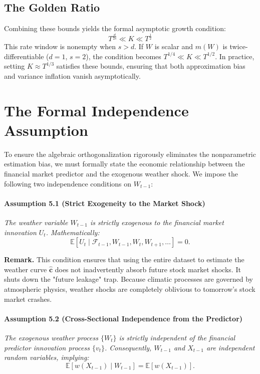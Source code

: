 \documentclass{article}
\begin{document}
\subsection{The Golden Ratio}
Combining these bounds yields the formal asymptotic growth condition:
\begin{equation}
    T^{\frac{d}{2s}} \ll K \ll T^{\frac{1}{2}}
\end{equation}
This rate window is nonempty when $s>d$.
If $W$ is scalar and $m(W)$ is twice-differentiable ($d=1$, $s=2$), the condition becomes $T^{1/4} \ll K \ll T^{1/2}$. In practice, setting $K \approx T^{1/3}$ satisfies these bounds, ensuring that both approximation bias and variance inflation vanish asymptotically.

\section{The Formal Independence Assumption}

To ensure the algebraic orthogonalization rigorously eliminates the nonparametric estimation bias, we must formally state the economic relationship between the financial market predictor and the exogenous weather shock. We impose the following two independence conditions on $W_{t-1}$:

\paragraph*{Assumption 5.1 (Strict Exogeneity to the Market Shock)} \textit{The weather variable $W_{t-1}$ is strictly exogenous to the financial market innovation $U_t$. Mathematically:}
\begin{equation}
    \mathbb{E}[U_t \mid \mathcal{F}_{t-1}, W_{t-1}, W_t, W_{t+1}, \dots ] = 0.
\end{equation}

\noindent \textbf{Remark.} This condition ensures that using the entire dataset to estimate the weather curve $\widehat{\bm{c}}$ does not inadvertently absorb future stock market shocks. It shuts down the "future leakage" trap. Because climatic processes are governed by atmospheric physics, weather shocks are completely oblivious to tomorrow's stock market crashes.

\paragraph*{Assumption 5.2 (Cross-Sectional Independence from the Predictor)} \textit{The exogenous weather process $\{W_t\}$ is strictly independent of the financial predictor innovation process $\{v_t\}$. Consequently, $W_{t-1}$ and $X_{t-1}$ are independent random variables, implying:}
\begin{equation}
    \mathbb{E}[w(X_{t-1}) \mid W_{t-1}] = \mathbb{E}[w(X_{t-1})].
\end{equation}
\end{document}

